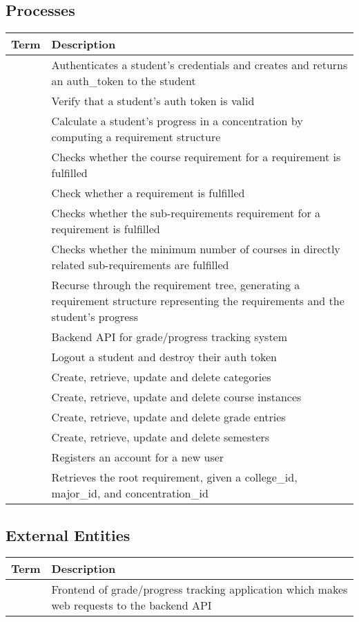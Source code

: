 \documentclass[12pt]{article}
\newenvironment{dictionary}[1]
{
    \subsection{#1}
    \begin{table}[H]
    \begin{tabular}{ | m{\dimexpr.45\linewidth-1\tabcolsep-1.3333\arrayrulewidth}
                     | m{\dimexpr.55\linewidth-1\tabcolsep-1.3333\arrayrulewidth} | }
    \hline
    \textbf{Term} & \textbf{Description} \\ \hline
}
{
    \end{tabular}
    \end{table}
}
\newcommand{\dictitem}[2]{\detokenize{#1} & #2 \\ \hline}
\begin{document}

\begin{dictionary}{Processes}
    \dictitem{Authenticate Student}{Authenticates a student's credentials and creates and returns an
    auth\_token to the student}
    \dictitem{Authenticate Student}{Verify that a student's auth token is valid}
    \dictitem{Calculate Concentration Progress}{Calculate a student's progress in a concentration
    by computing a requirement structure}
    \dictitem{Check Course Requirements}{Checks whether the course requirement for a requirement
    is fulfilled}
    \dictitem{Check Fulfillment}{Check whether a requirement is fulfilled}
    \dictitem{Check Sub-Requirements}{Checks whether the sub-requirements requirement for a
    requirement is fulfilled}
    \dictitem{Check Sub-requirement Course Count}{Checks whether the minimum number of courses in
    directly related sub-requirements are fulfilled}
    \dictitem{Generate Requirement Structure}{Recurse through the requirement tree, generating a
    requirement structure representing the requirements and the student's progress}
    \dictitem{Grade/Progress Tracking System}{Backend API for grade/progress tracking system}
    \dictitem{Logout Student}{Logout a student and destroy their auth token}
    \dictitem{Manage Categories}{Create, retrieve, update and delete categories}
    \dictitem{Manage Courses}{Create, retrieve, update and delete course instances}
    \dictitem{Manage Grade Entries}{Create, retrieve, update and delete grade entries}
    \dictitem{Manage Semesters}{Create, retrieve, update and delete semesters}
    \dictitem{Register User}{Registers an account for a new user}
    \dictitem{Retrieve Requirement}{Retrieves the root requirement, given a college\_id, major\_id,
    and concentration\_id}
\end{dictionary}


\begin{dictionary}{External Entities}
    \dictitem{System Frontend}{Frontend of grade/progress tracking application which makes web
    requests to the backend API}
\end{dictionary}
\end{document}
